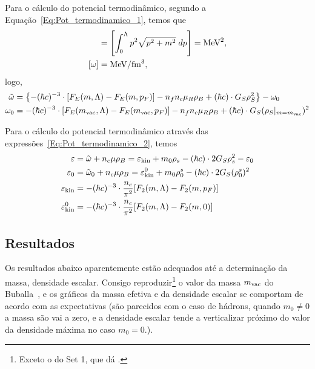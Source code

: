 Para o cálculo do potencial termodinâmico, segundo a Equação~\ref{Eq:Pot_termodinamico_1}, temos que
\begin{align}
	[F_E] &= \left[\int_0^\Lambda p^2\sqrt{p^2+m^2} \;dp\right] = \rm{MeV}^2, \\
	[\omega] &= \rm{MeV}/\rm{fm}^3,
\end{align}
%
logo,
\begin{align}
	\tilde{\omega} &= \left\{- (\hbar c)^{-3} \cdot [F_E(m, \Lambda) - F_E(m, p_F)] - n_fn_c\mu_R\rho_B + (\hbar c) \cdot G_S\rho_S^2\right\} - \omega_0 \\
	\omega_0 &= - (\hbar c)^{-3} \cdot [F_E(m_{\rm{vac}}, \Lambda) - F_E(m_{\rm{vac}}, p_F)] - n_fn_c\mu_R\rho_B + (\hbar c) \cdot G_S(\rho_S|_{m = m_{\rm{vac}}})^2
\end{align}

Para o cálculo do potencial termodinâmico através das expressões~\eqref{Eq:Pot_termodinamico_2}, temos
\begin{subequations}
\begin{align}
	\varepsilon &= \tilde{\omega} + n_c\mu\rho_B = \varepsilon_{\rm{kin}} + m_0\rho_s - (\hbar c) \cdot 2G_S\rho_s^2 - \varepsilon_0\\
	\varepsilon_0 &= \tilde{\omega}_0 + n_c\mu\rho_B = \varepsilon_{\rm{kin}}^0 + m_0\rho_0^s - (\hbar c) \cdot 2G_S(\rho_0^s)^2 \\
	\varepsilon_{\rm{kin}} &= -(\hbar c)^{-3} \cdot \frac{n_c}{\pi^2} [F_2(m, \Lambda) - F_2(m, p_F)] \\
	\varepsilon_{\rm{kin}}^0 &= -(\hbar c)^{-3} \cdot \frac{n_c}{\pi^2} [F_2(m, \Lambda) - F_2(m, 0)]
\end{align}
\end{subequations}

\subsection{Resultados}

Os resultados abaixo aparentemente estão adequados até a determinação da massa, densidade escalar. Consigo reproduzir\footnote{Exceto o do Set 1, que dá .} o valor da massa $m_{\rm{vac}}$ do Buballa~\cite{Buballa1996}, e os gráficos da massa efetiva e da densidade escalar se comportam de acordo com as expectativas (são parecidos com o caso de hádrons, quando $m_0 \neq 0$ a massa são vai a zero, e a densidade escalar tende a verticalizar próximo do valor da densidade máxima no caso $m_0 = 0$.).

